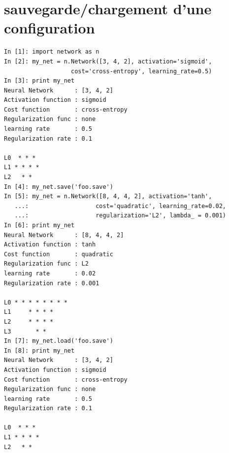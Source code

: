 \documentclass[11pt]{article}
\begin{document}
\section{sauvegarde/chargement d'une configuration}
\label{saveload}
\begin{lstlisting}
In [1]: import network as n
In [2]: my_net = n.Network([3, 4, 2], activation='sigmoid',
                   cost='cross-entropy', learning_rate=0.5)
In [3]: print my_net
Neural Network      : [3, 4, 2]
Activation function : sigmoid
Cost function       : cross-entropy
Regularization func : none
learning rate       : 0.5
Regularization rate : 0.1

L0  * * *
L1 * * * *
L2   * *
In [4]: my_net.save('foo.save')
In [5]: my_net = n.Network([8, 4, 4, 2], activation='tanh',
   ...:                   cost='quadratic', learning_rate=0.02,
   ...:				      regularization='L2', lambda_ = 0.001)
In [6]: print my_net
Neural Network      : [8, 4, 4, 2]
Activation function : tanh
Cost function       : quadratic
Regularization func : L2
learning rate       : 0.02
Regularization rate : 0.001

L0 * * * * * * * *
L1     * * * *
L2     * * * *
L3       * *
In [7]: my_net.load('foo.save')
In [8]: print my_net
Neural Network      : [3, 4, 2]
Activation function : sigmoid
Cost function       : cross-entropy
Regularization func : none
learning rate       : 0.5
Regularization rate : 0.1

L0  * * *
L1 * * * *
L2   * *
\end{lstlisting}

\newpage
\end{document}
